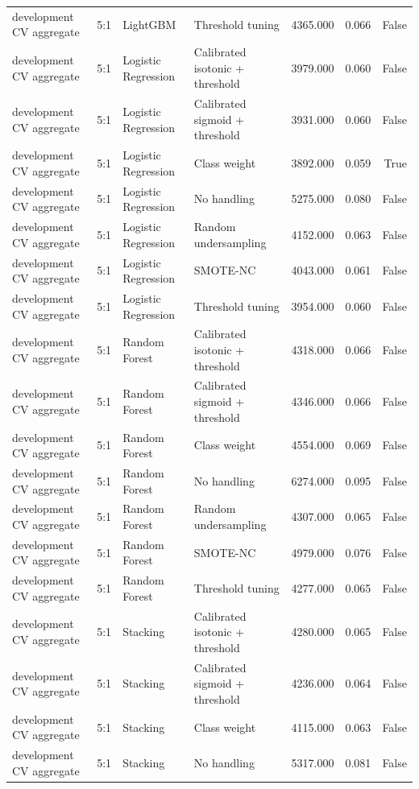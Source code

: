 \begin{tabular}{llllrrr}
development CV aggregate & 5:1 & LightGBM & Threshold tuning & 4365.000 & 0.066 & False \\
development CV aggregate & 5:1 & Logistic Regression & Calibrated isotonic + threshold & 3979.000 & 0.060 & False \\
development CV aggregate & 5:1 & Logistic Regression & Calibrated sigmoid + threshold & 3931.000 & 0.060 & False \\
development CV aggregate & 5:1 & Logistic Regression & Class weight & 3892.000 & 0.059 & True \\
development CV aggregate & 5:1 & Logistic Regression & No handling & 5275.000 & 0.080 & False \\
development CV aggregate & 5:1 & Logistic Regression & Random undersampling & 4152.000 & 0.063 & False \\
development CV aggregate & 5:1 & Logistic Regression & SMOTE-NC & 4043.000 & 0.061 & False \\
development CV aggregate & 5:1 & Logistic Regression & Threshold tuning & 3954.000 & 0.060 & False \\
development CV aggregate & 5:1 & Random Forest & Calibrated isotonic + threshold & 4318.000 & 0.066 & False \\
development CV aggregate & 5:1 & Random Forest & Calibrated sigmoid + threshold & 4346.000 & 0.066 & False \\
development CV aggregate & 5:1 & Random Forest & Class weight & 4554.000 & 0.069 & False \\
development CV aggregate & 5:1 & Random Forest & No handling & 6274.000 & 0.095 & False \\
development CV aggregate & 5:1 & Random Forest & Random undersampling & 4307.000 & 0.065 & False \\
development CV aggregate & 5:1 & Random Forest & SMOTE-NC & 4979.000 & 0.076 & False \\
development CV aggregate & 5:1 & Random Forest & Threshold tuning & 4277.000 & 0.065 & False \\
development CV aggregate & 5:1 & Stacking & Calibrated isotonic + threshold & 4280.000 & 0.065 & False \\
development CV aggregate & 5:1 & Stacking & Calibrated sigmoid + threshold & 4236.000 & 0.064 & False \\
development CV aggregate & 5:1 & Stacking & Class weight & 4115.000 & 0.063 & False \\
development CV aggregate & 5:1 & Stacking & No handling & 5317.000 & 0.081 & False \\

\end{tabular}
